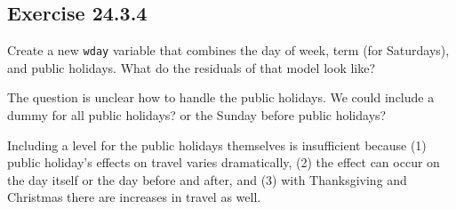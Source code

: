 \documentclass[]{book}
\newenvironment{Shaded}{\begin{snugshade}}{\end{snugshade}}
\newcommand{\CommentTok}[1]{\textcolor[rgb]{0.56,0.35,0.01}{\textit{#1}}}
\newcommand{\KeywordTok}[1]{\textcolor[rgb]{0.13,0.29,0.53}{\textbf{#1}}}
\newcommand{\NormalTok}[1]{#1}
\newcommand{\OperatorTok}[1]{\textcolor[rgb]{0.81,0.36,0.00}{\textbf{#1}}}
\newcommand{\StringTok}[1]{\textcolor[rgb]{0.31,0.60,0.02}{#1}}
\theoremstyle{plain}
\theoremstyle{remark}
\theoremstyle{definition}
\theoremstyle{definition}
\theoremstyle{definition}
\theoremstyle{remark}
\begin{document}
\begin{Shaded}
\end{Shaded}

\hypertarget{exercise-24.3.4}{%
\subsection*{\texorpdfstring{Exercise
{24.3.4}}{Exercise 24.3.4}}\label{exercise-24.3.4}}

Create a new \texttt{wday} variable that combines the day of week, term
(for Saturdays), and public holidays. What do the residuals of that
model look like?

The question is unclear how to handle the public holidays. We could
include a dummy for all public holidays? or the Sunday before public
holidays?

Including a level for the public holidays themselves is insufficient
because (1) public holiday's effects on travel varies dramatically, (2)
the effect can occur on the day itself or the day before and after, and
(3) with Thanksgiving and Christmas there are increases in travel as
well.
\end{document}
